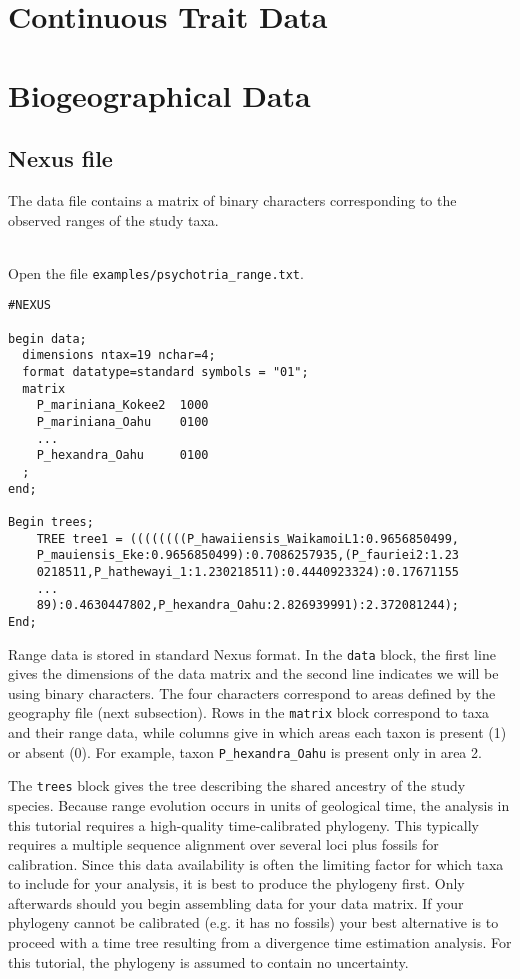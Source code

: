 \section{Continuous Trait Data}


\section{Biogeographical Data}

\subsection{Nexus file}

The data file contains a matrix of binary characters corresponding to the observed ranges of the study taxa.

\noindent \\ \impmark  Open the file \texttt{examples/psychotria\_range.txt}.

\begin{framed}
\begin{lstlisting}
#NEXUS

begin data;
  dimensions ntax=19 nchar=4;
  format datatype=standard symbols = "01";
  matrix
    P_mariniana_Kokee2  1000
    P_mariniana_Oahu    0100
    ...
    P_hexandra_Oahu     0100
  ;
end;

Begin trees;
	TREE tree1 = ((((((((P_hawaiiensis_WaikamoiL1:0.9656850499,
	P_mauiensis_Eke:0.9656850499):0.7086257935,(P_fauriei2:1.23
	0218511,P_hathewayi_1:1.230218511):0.4440923324):0.17671155
	...
	89):0.4630447802,P_hexandra_Oahu:2.826939991):2.372081244);
End;
\end{lstlisting}
\end{framed}

Range data is stored in standard Nexus format.
In the {\tt data} block, the first line gives the dimensions of the data matrix and the second line indicates we will be using binary characters.
The four characters correspond to areas defined by the geography file (next subsection).
Rows in the {\tt matrix} block correspond to taxa and their range data, while columns give in which areas each taxon is present (1) or absent (0).
For example, taxon {\tt P\_hexandra\_Oahu} is present only in area 2.

The {\tt trees} block gives the tree describing the shared ancestry of the study species.
Because range evolution occurs in units of geological time, the analysis in this tutorial requires a high-quality time-calibrated phylogeny.
This typically requires a multiple sequence alignment over several loci plus fossils for calibration.
Since this data availability is often the limiting factor for which taxa to include for your analysis, it is best to produce the phylogeny first.
Only afterwards should you begin assembling data for your data matrix.
If your phylogeny cannot be calibrated (e.g. it has no fossils) your best alternative is to proceed with a time tree resulting from a divergence time estimation analysis.
For this tutorial, the phylogeny is assumed to contain no uncertainty.

